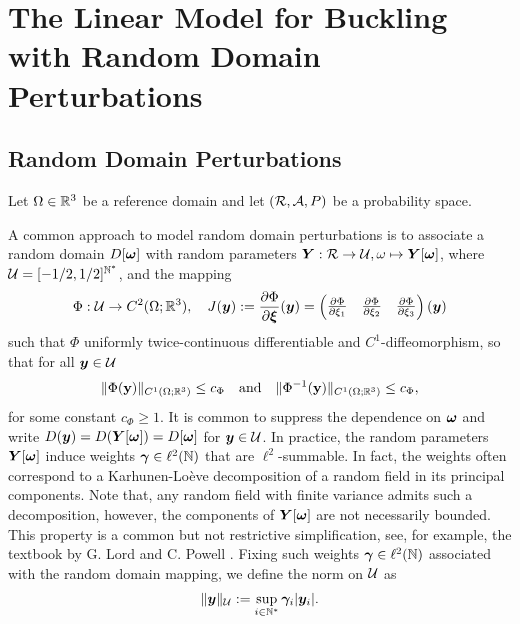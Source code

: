 \section{The Linear Model for Buckling with Random Domain Perturbations}\label{sec:LinearModel}
\subsection{Random Domain Perturbations}
Let $\Omega \in \mathbb{R}^3$ be a reference domain and let $(\mathcal{R},\mathcal{A},P)$ be a probability space. 

A common approach  to model random domain perturbations \cite{Harbrecht2023DomainUncertainty}
is to associate a random domain $D[{\boldsymbol{\omega}}]$ with random parameters $\boldsymbol{Y}: \mathcal{R} \to \mathcal{U}, \omega \mapsto \boldsymbol{Y}[{\boldsymbol{\omega}}]$, where $\mathcal{U} = [-1/2,1/2]^{\mathbb{N}^*}$, and the mapping  
\begin{align}\label{eq:definitionPhiandJ}
    \Phi: \mathcal{U} \to C^2(\Omega;\mathbb{R}^3), \quad J({\boldsymbol{y}}) := \frac{\partial \Phi}{\partial {\boldsymbol{\xi}}}({\boldsymbol{y}})= \begin{pmatrix}
        \frac{\partial \Phi}{\partial \xi_1}& \frac{\partial \Phi}{\partial \xi_2}& \frac{\partial \Phi}{\partial \xi_3}
    \end{pmatrix} ({\boldsymbol{y}})
\end{align} such that $\Phi$ uniformly twice-continuous differentiable and $C^1$-diffeomorphism, so that for all ${\boldsymbol{y}} \in \mathcal{U}$
\begin{align*}
    \| \Phi(\mathbf{y}) \|_{C^1(\Omega;\mathbb{R}^3 )} \leq c_{\Phi} \quad \text{and} \quad  \| \Phi^{-1}(\mathbf{y}) \|_{C^1(\Omega;\mathbb{R}^3 )} \leq c_{\Phi},
\end{align*} for some constant $c_\Phi \geq 1$. It is common to suppress the dependence on ${\boldsymbol{\omega}}$ and write $ D({\boldsymbol{y}})  = D(\boldsymbol{Y}[{\boldsymbol{\omega}}])=  D[{\boldsymbol{\omega}}]$ for ${\boldsymbol{y}} \in \mathcal{U}$.
In practice, the random parameters $\boldsymbol{Y}[{\boldsymbol{\omega}}]$ induce weights ${\boldsymbol{\gamma}} \in \ell^2(\mathbb{N})$ that are $\ell^2$-summable. In fact, the weights often correspond to a Karhunen-Loève decomposition of a random field in its principal components. Note that, any random field with finite variance admits such a decomposition, however, the components of $\boldsymbol{Y}[{\boldsymbol{\omega}}]$ are not necessarily bounded. This property is a common but not restrictive simplification, see, for example, the textbook by G. Lord and C. Powell \cite[Chapter 7]{Lord_Powell_Shardlow_2014}. Fixing such weights ${\boldsymbol{\gamma}} \in \ell^2(\mathbb{N})$ associated with the random domain mapping, we define the norm on $\mathcal{U} $ as 
\begin{align*}
    \| {\boldsymbol{y}} \|_{\mathcal{U}} := \sup_{i \in \mathbb{N}^*}  \boldsymbol{\gamma}_i \vert {\boldsymbol{y}}_i \vert.
\end{align*} 


